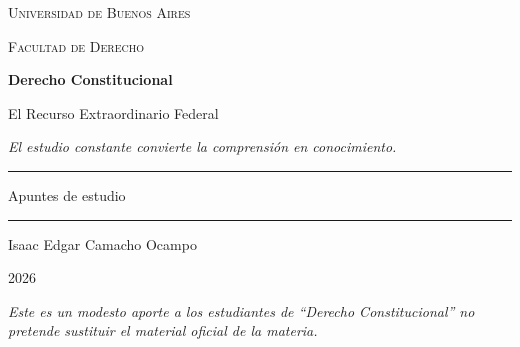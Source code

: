 \documentclass[12pt,oneside]{book}
\newcommand{\universidad}{Universidad de Buenos Aires}
\newcommand{\facultad}{Facultad de Derecho}
\newcommand{\materia}{Derecho Constitucional}
\newcommand{\titulo}{El Recurso Extraordinario Federal}
\newcommand{\autor}{Isaac Edgar Camacho Ocampo}
\newcommand{\anio}{2026}
\begin{document}
\frontmatter

\begin{titlepage}

\thispagestyle{empty}

\begin{center}

\vspace*{1cm}

{\large \textsc{\universidad}}

\vspace{0.2cm}

{\large \textsc{\facultad}}

\vspace{3cm}

{\Huge \textbf{\materia}}

\vspace{1cm}

{\LARGE \titulo}

\vspace{0.8cm}

\textit{El estudio constante convierte la comprensión en conocimiento.}

\vspace{1.2cm}

\rule{0.70\textwidth}{0.5pt}

\vspace{0.5cm}

{\large Apuntes de estudio}

\vspace{0.5cm}

\rule{0.70\textwidth}{0.5pt}

\vfill

{\large \autor}

\vspace{0.3cm}

{\large \anio}

\end{center}

\vfill

\begin{flushleft}
\textit{Este es un modesto aporte a los estudiantes de ``\materia'' no pretende sustituir el material oficial de la materia.}
\end{flushleft}

\end{titlepage}

\tableofcontents
\end{document}
